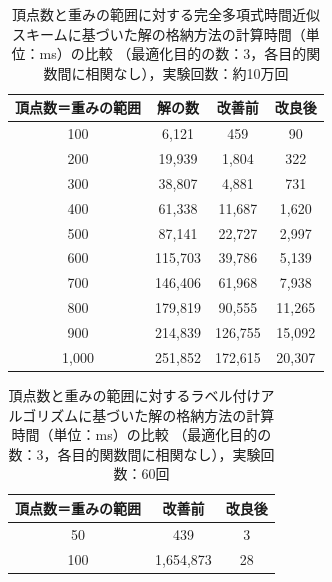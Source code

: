 \documentclass[12pt]{optlab-bachelor}
\begin{document}
\begin{table}[h]
  \centering
  \caption{頂点数と重みの範囲に対する完全多項式時間近似スキームに基づいた解の格納方法の計算時間（単位：ms）の比較
  （最適化目的の数：3，各目的関数間に相関なし），実験回数：約10万回}
  {\small
  \begin{tabular}{|c|c|c|c|} \hline
    頂点数＝重みの範囲 & 解の数 & 改善前 & 改良後 \\ \hline
    100	 & 6,121 & 	459 & 90 \\ \hline
    200	 & 19,939 & 	1,804 & 	322 \\ \hline
    300	 & 38,807 & 	4,881 & 	731 \\ \hline
    400	 & 61,338 & 	11,687 & 	1,620 \\ \hline
    500	 & 87,141 & 	22,727 & 	2,997 \\ \hline
    600	 & 115,703 & 	39,786 & 	5,139 \\ \hline
    700	 & 146,406 & 	61,968 & 	7,938 \\ \hline
    800	 & 179,819 & 	90,555 & 	11,265 \\ \hline
    900	 & 214,839 & 	126,755 & 	15,092 \\ \hline
    1,000	 & 251,852	 & 172,615 & 	20,307 \\ \hline
  \end{tabular}
  }
\end{table}

\begin{table}[h]
  \centering
  \caption{頂点数と重みの範囲に対するラベル付けアルゴリズムに基づいた解の格納方法の計算時間（単位：ms）の比較
  （最適化目的の数：3，各目的関数間に相関なし），実験回数：60回}
  {\small
  \begin{tabular}{|c|c|c|} \hline
    頂点数＝重みの範囲 & 改善前 & 改良後 \\ \hline
    50 & 439 & 3 \\ \hline
    100 & 1,654,873 & 28 \\ \hline
  \end{tabular}
  }
\end{table}
\end{document}
